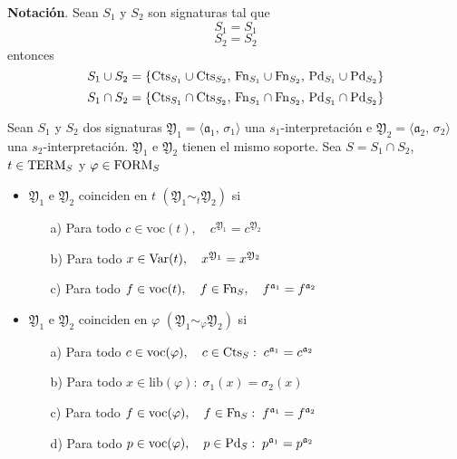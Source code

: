 \textbf{Notación}. Sean $S_1$ y $S_2$ son signaturas tal que 
\[ S_1= \si{S_1} \]
\[ S_2= \si{S_2} \]
entonces 
\[ S_1 \cup S_2 = \{ \mbox{Cts}_{S_1} \cup \mbox{Cts}_{S_2}, \, \mbox{Fn}_{S_1} \cup \mbox{Fn}_{S_2}, \, \mbox{Pd}_{S_1} \cup \mbox{Pd}_{S_2} \} \]
\[ S_1 \cap S_2 = \{ \mbox{Cts}_{S_1} \cap \mbox{Cts}_{S_2}, \, \mbox{Fn}_{S_1} \cap \mbox{Fn}_{S_2}, \, \mbox{Pd}_{S_1} \cap \mbox{Pd}_{S_2} \} \]

\begin{definition}
Sean $S_1$ y $S_2$ dos signaturas $\mathfrak{Y}_1=\langle \mathfrak{a}_1, \, \sigma_1 \rangle$ una $s_1$-interpretación e $\mathfrak{Y}_2=\langle \mathfrak{a}_2, \, \sigma_2 \rangle$ una $s_2$-interpretación. $\mathfrak{Y}_1$ e $\mathfrak{Y}_2$ tienen el mismo soporte. Sea $S=S_1 \cap S_2$, $t \in \mbox{TERM}_{S}$ y $\varphi \in \mbox{FORM}_{S}$
\begin{itemize}
	\item $\mathfrak{Y}_1$ e $\mathfrak{Y}_2$ coinciden en $t$ $(\mathfrak{Y}_1 \sim_{t} \mathfrak{Y}_2)$ si 
	\begin{itemize}
		\item[a)] Para todo $c \in \mbox{voc}(t), \quad c^{\mathfrak{Y}_1}=c^{\mathfrak{Y}_2}$
		\item[b)] Para todo $x \in \mbox{Var}(t), \quad x^{\mathfrak{Y}_1}=x^{\mathfrak{Y}_2}$
		\item[c)] Para todo $f \in \mbox{voc}(t), \quad f \in \mbox{Fn}_{S}, \quad f^{\mathfrak{a}_1}=f^{\mathfrak{a}_2}$
\end{itemize}	 
\item $\mathfrak{Y}_1$ e $\mathfrak{Y}_2$ coinciden en $\varphi$ $(\mathfrak{Y}_1 \sim_{\varphi} \mathfrak{Y}_2)$ si
\begin{itemize}
	\item[a)] Para todo $c \in \mbox{voc}(\varphi), \quad c \in \mbox{Cts}_{S}: \; c^{\mathfrak{a}_1}=c^{\mathfrak{a}_2}$
	\item[b)] Para todo $x \in \mbox{lib}(\varphi): \; \sigma_1(x)=\sigma_2(x)$
	\item[c)] Para todo $f \in \mbox{voc}(\varphi), \quad f \in \mbox{Fn}_{S}: \; f^{\mathfrak{a}_1}=f^{\mathfrak{a}_2}$
	\item[d)] Para todo $p \in \mbox{voc}(\varphi), \quad p \in \mbox{Pd}_{S}: \; p^{\mathfrak{a}_1}=p^{\mathfrak{a}_2}$
\end{itemize}
\end{itemize} 
\end{definition}
